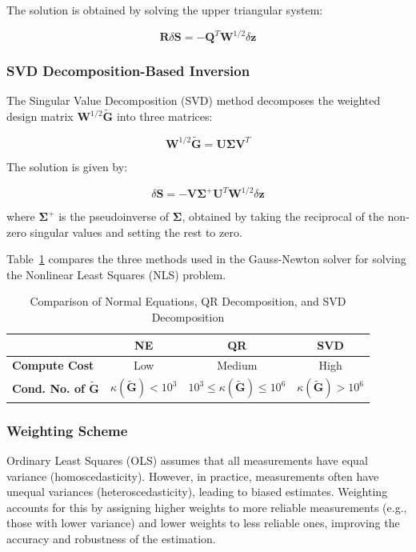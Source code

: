 \documentclass[conference]{IEEEtran}
\begin{document}
The solution is obtained by solving the upper triangular system:

\begin{equation}
\mathbf{R} \delta \mathbf{S} = -\mathbf{Q}^T \mathbf{W}^{1/2} \delta \mathbf{z}
\end{equation}

\subsubsection*{SVD Decomposition-Based Inversion}

The Singular Value Decomposition (SVD) method decomposes the weighted design matrix \( \mathbf{W}^{1/2} \tilde{\mathbf{G}} \) into three matrices:

\begin{equation}
\mathbf{W}^{1/2} \tilde{\mathbf{G}} = \mathbf{U} \boldsymbol{\Sigma} \mathbf{V}^T
\end{equation}

The solution is given by:

\begin{equation}
\delta \mathbf{S} = -\mathbf{V} \boldsymbol{\Sigma}^+ \mathbf{U}^T \mathbf{W}^{1/2} \delta \mathbf{z}
\end{equation}

where \( \boldsymbol{\Sigma}^+ \) is the pseudoinverse of \( \boldsymbol{\Sigma} \), obtained by taking the reciprocal of the non-zero singular values and setting the rest to zero.

Table~\ref{tab:comparison} compares the three methods used in the Gauss-Newton solver for solving the Nonlinear Least Squares (NLS) problem.

\begin{table}[h!]
\centering
\begin{tabular}{|l|c|c|c|}
\hline
\textbf{} & \textbf{NE} & \textbf{QR} & \textbf{SVD} \\
\hline
\textbf{Compute Cost} & Low & Medium & High \\
\hline
\textbf{Cond. No. of \( \tilde{\mathbf{G}} \)} & \( \kappa(\tilde{\mathbf{G}}) < 10^3 \) & \( 10^3 \leq \kappa(\tilde{\mathbf{G}}) \leq 10^6 \) & \( \kappa(\tilde{\mathbf{G}}) > 10^6 \) \\
\hline
\end{tabular}
\caption{Comparison of Normal Equations, QR Decomposition, and SVD Decomposition}
\label{tab:comparison}
\end{table}

\subsubsection*{Weighting Scheme}
Ordinary Least Squares (OLS) assumes that all measurements have equal variance (homoscedasticity). However, in practice, measurements often have unequal variances (heteroscedasticity), leading to biased estimates. Weighting accounts for this by assigning higher weights to more reliable measurements (e.g., those with lower variance) and lower weights to less reliable ones, improving the accuracy and robustness of the estimation.
\end{document}
